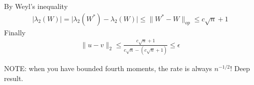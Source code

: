 \begin{example}
    By Weyl's inequality
    \begin{align}
        \lvert \lambda_2(W) \rvert
        = \lvert \lambda_2(W^*) - \lambda_2(W) \rvert
        \leq \|W^* - W\|_{op}
        \leq c \sqrt{n} + 1
    \end{align}
    Finally
    \begin{align}
        \|u - v\|_2 
        \leq \frac{c \sqrt{n} + 1}{c \sqrt{n} - (c \sqrt{n} + 1)}
        \leq \epsilon
    \end{align}
\end{example}

NOTE: when you have bounded fourth moments, the rate is always $n^{-1/2}$! Deep result.

